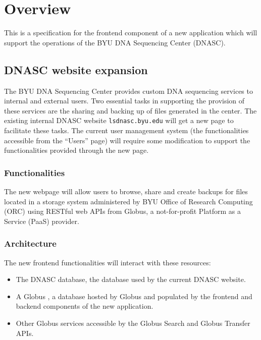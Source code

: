 
\section{Overview}

This is a specification for the frontend component of a new application which will
support the operations of the BYU DNA Sequencing Center (DNASC).

\subsection{DNASC website expansion}

The BYU DNA Sequencing Center provides custom DNA sequencing services to internal and 
external users. Two essential tasks in supporting the provision of these services are 
the sharing and backing up of files generated in the center. The existing internal DNASC 
website \texttt{lsdnasc.byu.edu} will get a new page to facilitate these tasks. The
current user management system (the functionalities accessible from the ``Users'' page) 
will require some modification to support the functionalities provided through the new 
page.

\subsubsection{Functionalities}

The new webpage will allow users to browse, share and create backups for files located in a 
storage system administered by BYU Office of Research Computing (ORC) using RESTful web 
APIs from Globus, a not-for-profit Platform as a Service (PaaS) provider.

\subsubsection{Architecture}

The new frontend functionalities will interact with these resources:
\begin{itemize}
    \item The DNASC database, the database used by the current DNASC website.
    \item A Globus , a database hosted by Globus and populated 
    by the frontend and backend components of the new application.
    \item Other Globus services accessible by the Globus Search and Globus Transfer APIs.
\end{itemize}

